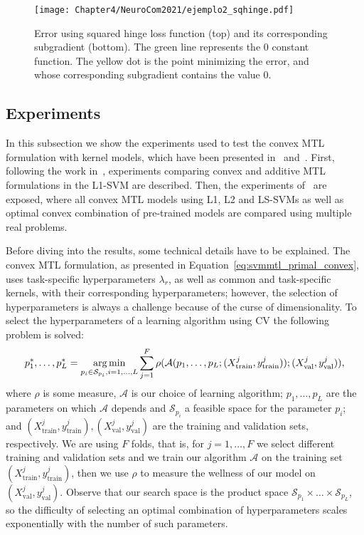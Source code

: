 \begin{figure}[t!]
    \centering
    \texttt{[image: Chapter4/NeuroCom2021/ejemplo2\_sqhinge.pdf]}
    \caption{Error using squared hinge loss function (top) and its corresponding subgradient (bottom). The green line represents the $0$ constant function. The yellow dot is the point minimizing the error, and whose corresponding subgradient contains the value $0$.}
    \label{fig:sqhinge_error}
\end{figure}







\subsection{Experiments}\label{subsec:convexmtlsvm_exp}
In this subsection we show the experiments used to test the convex MTL formulation with kernel models, which have been presented in~\citep{RuizAD19} and~\citep{RuizAD21}. 
%
First, following the work in~\citep{RuizAD19}, experiments comparing convex and additive MTL formulations in the L1-SVM are described. 
%
Then, the experiments of~\citep{RuizAD21} are exposed, where all convex MTL models using L1, L2 and LS-SVMs as well as optimal convex combination of pre-trained models are compared using multiple real problems.

Before diving into the results, some technical details have to be explained. The convex MTL formulation, as presented in Equation~\eqref{eq:svmmtl_primal_convex}, uses task-specific hyperparameters $\lambda_r$, as well as common and task-specific kernels, with their corresponding hyperparameters; however, the selection of hyperparameters is always a challenge because of the curse of dimensionality. 
%
To select the hyperparameters of a learning algorithm using CV the following problem is solved:
\begin{equation}
    \label{eq:hp-selection_general}
    p_1^*, \ldots, p_L^* = \argmin_{p_i \in \mathcal{S}_{p_i}, i=1, \ldots, L} \sum_{j=1}^{F} \rho(\mathcal{A}(p_1, \ldots, p_L; (X^j_\text{train}, y^j_\text{train})); (X^j_\text{val}, y^j_\text{val})) ,
\end{equation}
where $\rho$ is some measure, $\mathcal{A}$ is our choice of learning algorithm; $p_1, \ldots, p_L$ are the parameters on which $\mathcal{A}$ depends and $\mathcal{S}_{p_i}$ a feasible space for the parameter $p_i$; and $(X^j_\text{train}, y^j_\text{train}), (X^j_\text{val}, y^j_\text{val})$ are the training and validation sets, respectively. We are using $F$ folds, that is, for $j=1, \ldots, F$ we select different training and validation sets and we train our algorithm $\mathcal{A}$ on the training set $(X^j_\text{train}, y^j_\text{train})$, then we use $\rho$ to measure the wellness of our model on $(X^j_\text{val}, y^j_\text{val})$. 
%
Observe that our search space is the product space $\mathcal{S}_{p_1} \times \ldots \times \mathcal{S}_{p_L}$, so the difficulty of selecting an optimal combination of hyperparameters scales exponentially with the number of such parameters.

